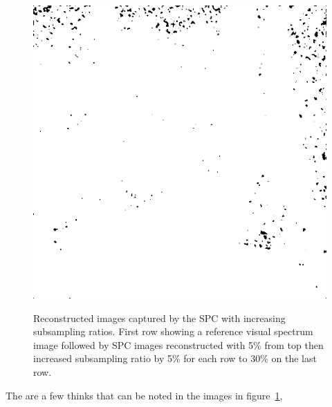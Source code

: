 \begin{figure}[H]
\begin{minipage}[t]{0.3\linewidth}
	\label{fig:hus_m30}
\end{minipage}
\begin{minipage}[t]{0.3\linewidth} %
	\includegraphics[width = 1\linewidth]{gfx/sit/sit_m30.png}
	\label{fig:sit_m30}
\end{minipage}
	\label{fig:subsampling_ratios}
	\caption{Reconstructed images captured by the SPC with increasing subsampling ratios. First row showing a reference visual spectrum image followed by SPC images reconstructed with 5\% from top then increased subsampling ratio by 5\% for each row to 30\% on the last row.} 
\end{figure}

The are a few thinks that can be noted in the images in figure~\ref{fig:subsampling_ratios}, 

